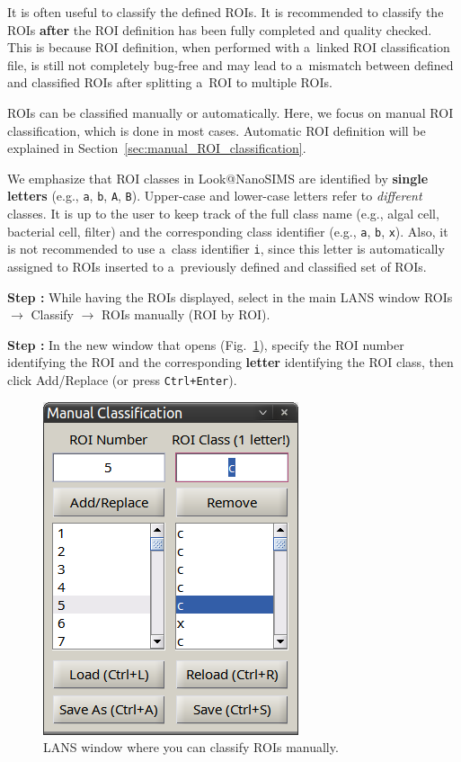 \documentclass[a4paper, 11pt]{article}
\newcommand{\ttt}[1]{\texttt{#1}}
\newcommand{\lans}[1]{{\color{magenta}#1}}
\newcommand{\lanstf}[1]{{\color{cyan}#1}}
\newcommand\ra{\rightarrow}
\newcounter{step}
\newcommand\s{\addtocounter{step}{1}\vskip5pt\noindent\textbf{Step \thestep:}{ }}
\newcommand\bb[1]{\textbf{#1}}
\begin{document}
It is often useful to classify the defined ROIs. It is recommended to classify the ROIs \bb{after} the ROI definition has been fully completed and quality checked. This is because ROI definition, when performed with a~linked ROI classification file, is still not completely bug-free and may lead to a~mismatch between defined and classified ROIs after splitting a~ROI to multiple ROIs.

ROIs can be classified manually or automatically. Here, we focus on manual ROI classification, which is done in most cases. Automatic ROI definition will be explained in Section~\ref{sec:manual_ROI_classification}.

We emphasize that ROI classes in Look@NanoSIMS are identified by \bb{single letters} (e.g., \ttt{a}, \ttt{b}, \ttt{A}, \ttt{B}). Upper-case and lower-case letters refer to \emph{different} classes. It is up to the user to keep track of the full class name (e.g., algal cell, bacterial cell, filter) and the corresponding class identifier (e.g., \ttt{a}, \ttt{b}, \ttt{x}). Also, it is not recommended to use a~class identifier \ttt{i}, since this letter is automatically assigned to ROIs inserted to a~previously defined and classified set of ROIs.

\setcounter{step}{0}

\s While having the ROIs displayed, select in the main LANS window \lans{ROIs} $\ra$ \lans{Classify} $\ra$ \lans{ROIs manually (ROI by ROI)}.

\s In the new window that opens (Fig.~\ref{fig:roi-classification}), specify the \lanstf{ROI number} identifying the ROI and the corresponding \bb{letter} identifying the \lanstf{ROI class}, then click \lans{Add/Replace} (or press \ttt{Ctrl+Enter}).

\begin{figure}[!ht]
\centering
\includegraphics[scale=0.4]{figs3/LANS-roi-classification}
\caption{\label{fig:roi-classification}%
LANS window where you can classify ROIs manually.}
\end{figure}
\end{document}
